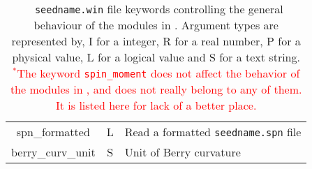 \begin{table}[hH!]
\begin{center}
\begin{tabular}{|c|c|p{6cm}|}
{\sc spn\_formatted}  & L & 
  Read a formatted {\tt seedname.spn} file\\
  {\sc berry\_curv\_unit} & S & Unit of Berry curvature\\ 
 \hline
\end{tabular}
\caption[Parameter file keywords controlling \postw.]  {{\tt
    seedname.win} file keywords controlling the general behaviour of
  the modules in \postw. Argument types are represented by, I for a
  integer, R for a real number, P for a
  physical value, L for a logical value and S for a text string.\\
  \textcolor{red}{$^*$The keyword {\tt spin\_moment} does not affect
    the behavior of the modules in \postw, and does not really belong
    to any of them. It is listed here for lack of a better place.}}
\label{parameter_keywords_postw90}
\end{center}
\end{table}


